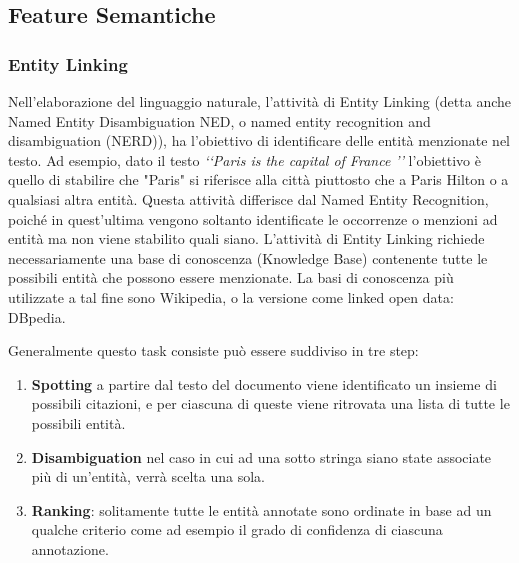 \subsection{Feature Semantiche}
\subsubsection{Entity Linking} 
Nell'elaborazione del linguaggio naturale, l'attività di Entity Linking (detta anche Named Entity Disambiguation NED, o named entity recognition and disambiguation (NERD)), ha l'obiettivo di identificare delle entità menzionate nel testo. Ad esempio, dato il testo \emph{\lq\lq Paris is the capital of France \rq \rq} l'obiettivo è quello di stabilire che   "Paris" si riferisce alla città piuttosto che a Paris Hilton o a qualsiasi altra entità.
Questa attività differisce dal Named Entity Recognition, poiché in quest'ultima vengono soltanto identificate le occorrenze o menzioni ad entità ma non viene stabilito quali siano.
L'attività di Entity Linking richiede necessariamente una base di conoscenza (Knowledge Base) contenente tutte le possibili entità che possono essere menzionate. La basi di conoscenza più utilizzate a tal fine sono  Wikipedia, o la versione come linked open data: DBpedia.

Generalmente questo task consiste può essere suddiviso in tre step:
\begin{enumerate}
\item \textbf{Spotting} a partire dal testo del documento viene identificato un insieme di possibili citazioni, e per ciascuna di queste viene ritrovata una lista di tutte le possibili entità.
\item \textbf{Disambiguation} nel caso in cui ad una sotto stringa siano state associate più di un'entità, verrà scelta una sola.
\item \textbf{Ranking}: solitamente tutte  le entità annotate sono ordinate in base ad un qualche criterio come ad esempio il grado di confidenza di ciascuna annotazione.
\end{enumerate}

